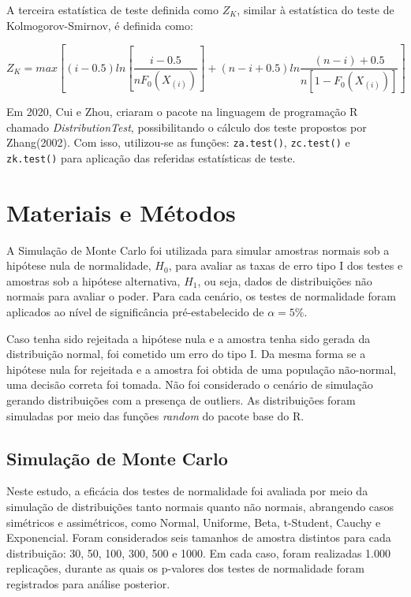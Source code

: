 \documentclass[a4paper,11pt]{article} %
\begin{document}
A terceira estatística de teste definida como $Z_{K}$, similar à estatística do teste de Kolmogorov-Smirnov, é definida como:

\begin{equation}
Z_{K} = max \left[(i-0.5)ln \left[ \frac{i-0.5}{n F_{0}(X_{(i)})} \right]  + (n-i+0.5) ln \frac{(n-i)+0.5}{n[1-F_{0}(X_{(i)})]} \right]
\end{equation}

Em 2020, Cui e Zhou, criaram o pacote na linguagem de programação R chamado \textit{DistributionTest}, possibilitando o cálculo dos teste propostos por Zhang(2002). Com isso,  utilizou-se as funções: \texttt{za.test()}, \texttt{zc.test()} e \texttt{zk.test()} para aplicação das referidas estatísticas de teste. \vskip0.3cm




\section{Materiais e Métodos}
A Simulação de Monte Carlo foi utilizada para simular amostras normais sob a hipótese nula de normalidade, $H_0$, para avaliar as taxas de erro tipo I dos testes e amostras sob a hipótese alternativa, $H_1$, ou seja, dados de distribuições não normais para avaliar o poder. Para cada cenário, os testes de normalidade foram aplicados ao nível de significância pré-estabelecido de $\alpha = 5\%$. \vskip0.3cm

Caso tenha sido rejeitada a hipótese nula e a amostra tenha sido gerada da distribuição normal, foi cometido um erro do tipo I. Da mesma forma se a hipótese nula for rejeitada e a amostra foi obtida de uma população não-normal, uma decisão correta foi tomada. Não foi considerado o cenário de simulação gerando distribuições com a presença de outliers. As distribuições foram simuladas por meio das funções \textit{random} do pacote base do R.

\subsection{Simulação de Monte Carlo}
Neste estudo, a eficácia dos testes de normalidade foi avaliada por meio da simulação de distribuições tanto normais quanto não normais, abrangendo casos simétricos e assimétricos, como Normal, Uniforme, Beta, t-Student, Cauchy e Exponencial. Foram considerados seis tamanhos de amostra distintos para cada distribuição: 30, 50, 100, 300, 500 e 1000. Em cada caso, foram realizadas 1.000 replicações, durante as quais os p-valores dos testes de normalidade foram registrados para análise posterior. \vskip0.3cm
\end{document}

